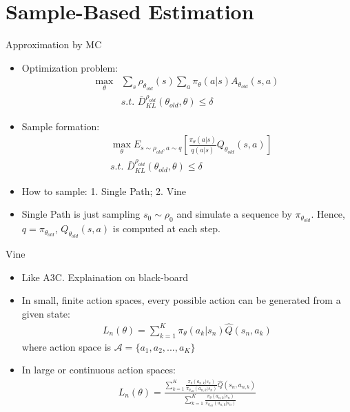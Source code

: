 \documentclass[mathserif]{beamer}
\begin{document}
\section{Sample-Based Estimation}
\begin{frame}[t]{Approximation by MC}
  \begin{itemize}
    \item Optimization problem:
    \begin{align}
      \max_{\theta} &\sum_{s}\rho_{\theta_{old}}(s)\sum_{a}\pi_{\theta}(a|s)A_{\theta_{old}}(s,a)\\
      &s.t.\hspace{4pt}\bar{D}_{KL}^{\rho_{old}}(\theta_{old},\theta)\le\delta
    \end{align}
    \item Sample formation:
    \begin{align}
      &\max_{\theta}E_{s\sim\rho_{old},a\sim q}[\frac{\pi_{\theta}(a|s)}{q(a|s)}Q_{\theta_{old}}(s,a)]\\
      &s.t.\hspace{4pt}\bar{D}_{KL}^{\rho_{old}}(\theta_{old},\theta)\le\delta
    \end{align}
    \item How to sample: 1. Single Path; 2. Vine
    \item Single Path is just sampling $s_{0}\sim\rho_{0}$ and simulate a sequence by $\pi_{\theta_{old}}$. Hence, $q=\pi_{\theta_{old}}$, $Q_{\theta_{old}}(s,a)$ is computed at each step.
  \end{itemize}
\end{frame}
\begin{frame}[t]{Vine}
\begin{itemize}
  \item Like A3C. Explaination on black-board
  \item In small, finite action spaces, every possible action can be generated from a given state:
  \begin{align}
    L_{n}(\theta)=\sum_{k=1}^{K}\pi_{\theta}(a_{k}|s_{n})\hat{Q}(s_{n},a_{k})
  \end{align}
  where action space is $\mathcal{A}=\{a_{1},a_{2},...,a_{K}\}$
  \item In large or continuous action spaces:
  \begin{align}
    L_{n}(\theta)=\frac{\sum_{k=1}^{K}\frac{\pi_{\theta}(a_{n,k}|s_{n})}{\pi_{\theta_{old}}(a_{n,k}|s_{n})}\hat{Q}(s_{n},a_{n,k})}{\sum_{k=1}^{K}\frac{\pi_{\theta}(a_{n,k}|s_{n})}{\pi_{\theta_{old}}(a_{n,k}|s_{n})}}
  \end{align}
\end{itemize}
\end{frame}
\end{document}
